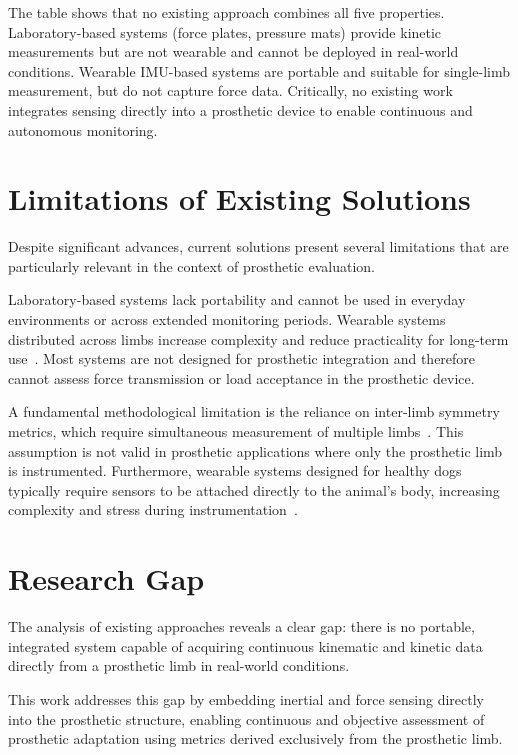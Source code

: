 \noindent
The table shows that no existing approach combines all five properties.
Laboratory-based systems (force plates, pressure mats) provide kinetic
measurements but are not wearable and cannot be deployed in real-world
conditions. Wearable IMU-based systems are portable and suitable for
single-limb measurement, but do not capture force data.
Critically, no existing work integrates sensing directly into a prosthetic
device to enable continuous and autonomous monitoring.

\section{Limitations of Existing Solutions}

Despite significant advances, current solutions present several limitations
that are particularly relevant in the context of prosthetic evaluation.

Laboratory-based systems lack portability and cannot be used in everyday
environments or across extended monitoring periods.
Wearable systems distributed across limbs increase complexity and reduce
practicality for long-term use~\cite{Zhang2022}.
Most systems are not designed for prosthetic integration and therefore
cannot assess force transmission or load acceptance in the prosthetic device.

A fundamental methodological limitation is the reliance on inter-limb
symmetry metrics, which require simultaneous measurement of multiple
limbs~\cite{Oosterlinck2011,Fahie2018}.
This assumption is not valid in prosthetic applications where only the
prosthetic limb is instrumented.
Furthermore, wearable systems designed for healthy dogs typically require
sensors to be attached directly to the animal's body, increasing complexity
and stress during instrumentation~\cite{Zhang2022,Blattler2024}.

\section{Research Gap}

The analysis of existing approaches reveals a clear gap: there is no
portable, integrated system capable of acquiring continuous kinematic and
kinetic data directly from a prosthetic limb in real-world conditions.

This work addresses this gap by embedding inertial and force sensing directly
into the prosthetic structure, enabling continuous and objective assessment of
prosthetic adaptation using metrics derived exclusively from the prosthetic limb.
